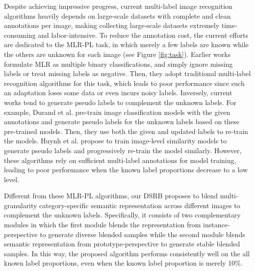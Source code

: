 \documentclass[lettersize,journal]{IEEEtran}
\begin{document}
Despite achieving impressive progress, current multi-label image recognition algorithms heavily depends on large-scale datasets with complete and clean annotations per image, making collecting large-scale datasets extremely time-consuming and labor-intensive. To reduce the annotation cost, the current efforts \cite{Durand2019CVPR, Huynh2020CVPR, Chen2022SST, Pu2022SARB} are dedicated to the MLR-PL task, in which merely a few labels are known while the others are unknown for each image (see Figure \ref{fig:task}). Earlier works \cite{Sun2017ICCV, Joulin2016ECCV} formulate MLR as multiple binary classifications, and simply ignore missing labels or treat missing labels as negative. Then, they adopt traditional multi-label recognition algorithms for this task, which leads to poor performance since such an adaptation loses some data or even incurs noisy labels. Inversely, current works tend to generate pseudo labels to complement the unknown labels. For example, Durand et al. \cite{Durand2019CVPR} pre-train image classification models with the given annotations and generate pseudo labels for the unknown labels based on these pre-trained models. Then, they use both the given and updated labels to re-train the models. Huynh et al. \cite{Huynh2020CVPR} propose to train image-level similarity models to generate pseudo labels and progressively re-train the model similarly. However, these algorithms rely on sufficient multi-label annotations for model training, leading to poor performance when the known label proportions decrease to a low level.

Different from these MLR-PL algorithms, our DSRB proposes to blend multi-granularity category-specific semantic representation across different images to complement the unknown labels. Specifically, it consists of two complementary modules in which the first module blends the representation from instance-perspective to generate diverse blended samples while the second module blends semantic representation from prototype-perspective to generate stable blended samples. In this way, the proposed algorithm performs consistently well on the all known label proportions, even when the known label proportion is merely 10\%.
\end{document}
